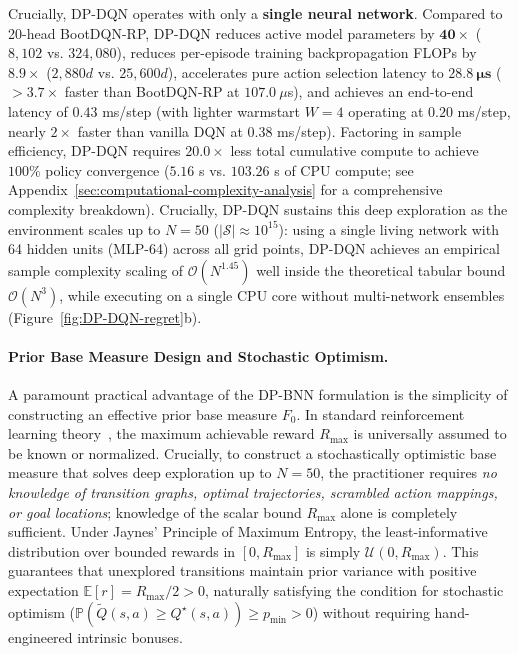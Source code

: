\documentclass[10pt]{article}
\begin{document}
Crucially, DP-DQN operates with only a \textbf{single neural network}. Compared to 20-head BootDQN-RP, DP-DQN reduces active model parameters by $\mathbf{40\times}$ ($8{,}102$ vs. $324{,}080$), reduces per-episode training backpropagation FLOPs by $\mathbf{8.9\times}$ ($2{,}880d$ vs. $25{,}600d$), accelerates pure action selection latency to $\mathbf{28.8\ \mu s}$ ($>3.7\times$ faster than BootDQN-RP at $107.0\ \mu$s), and achieves an end-to-end latency of $\mathbf{0.43}$ ms/step (with lighter warmstart $W=4$ operating at $0.20$ ms/step, nearly $2\times$ faster than vanilla DQN at $0.38$ ms/step). Factoring in sample efficiency, DP-DQN requires $\mathbf{20.0\times}$ less total cumulative compute to achieve $100\%$ policy convergence ($5.16$ s vs. $103.26$ s of CPU compute; see Appendix~\ref{sec:computational-complexity-analysis} for a comprehensive complexity breakdown). Crucially, DP-DQN sustains this deep exploration as the environment scales up to $N=50$ ($|\mathcal{S}| \approx 10^{15}$): using a single living network with 64 hidden units (MLP-64) across all grid points, DP-DQN achieves an empirical sample complexity scaling of $\mathcal{O}(N^{1.45})$ well inside the theoretical tabular bound $\mathcal{O}(N^3)$, while executing on a single CPU core without multi-network ensembles (Figure~\ref{fig:DP-DQN-regret}b).

\paragraph{Prior Base Measure Design and Stochastic Optimism.}
A paramount practical advantage of the DP-BNN formulation is the simplicity of constructing an effective prior base measure $F_0$. In standard reinforcement learning theory~\citep{brafman2002r, osband2013more}, the maximum achievable reward $R_{\max}$ is universally assumed to be known or normalized. Crucially, to construct a stochastically optimistic base measure that solves deep exploration up to $N=50$, the practitioner requires \emph{no knowledge of transition graphs, optimal trajectories, scrambled action mappings, or goal locations}; knowledge of the scalar bound $R_{\max}$ alone is completely sufficient. Under Jaynes' Principle of Maximum Entropy, the least-informative distribution over bounded rewards in $[0, R_{\max}]$ is simply $\mathcal{U}(0, R_{\max})$. This guarantees that unexplored transitions maintain prior variance with positive expectation $\mathbb{E}[r] = R_{\max}/2 > 0$, naturally satisfying the condition for stochastic optimism ($\mathbb{P}(\tilde{Q}(s, a) \ge Q^\star(s, a)) \ge p_{\min} > 0$) without requiring hand-engineered intrinsic bonuses. 
\end{document}
